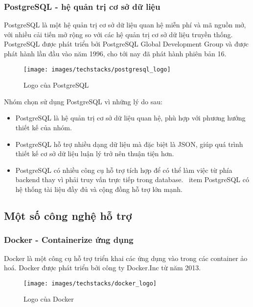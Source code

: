 \documentclass[../main.tex]{subfiles}
\begin{document}
	\subsubsection{PostgreSQL - hệ quản trị cơ sở dữ liệu}

	PostgreSQL là một hệ quản trị cơ sở dữ liệu quan hệ miễn phí và mã nguồn mở, với nhiều cải tiến mở rộng so với các hệ
	quản trị cơ sở dữ liệu truyền thống. PostgreSQL được phát triển bởi PostgreSQL Global Development Group và được phát
	hành lần đầu vào năm 1996, cho tới nay đã phát hành phiên bản 16.

	\begin{figure}[ht]
		\centering
		\texttt{[image: images/techstacks/postgresql\_logo]}
		\caption{Logo của PostgreSQL}
		\label{fig:pg-logo}
	\end{figure}

	Nhóm chọn sử dụng PostgreSQL vì những lý do sau:

	\begin{itemize}
		\item PostgreSQL là hệ quản trị cơ sở dữ liệu quan hệ, phù hợp với phương hướng thiết kế của nhóm.
		\item PostgreSQL hỗ trợ nhiều dạng dữ liệu mà đặc biệt là JSON, giúp quá trình thiết kế cơ sở dữ liệu luận lý trở
		nên thuận tiện hơn.
		\item PostgreSQL có nhiều công cụ hỗ trợ tích hợp để có thể làm việc từ phía \Gls{backend} thay vì phải truy vấn
		trực tiếp trong database.
		\ item PostgreSQL có hệ thống tài liệu đầy đủ và cộng đồng hỗ trợ lớn mạnh.
	\end{itemize}

	\subsection{Một số công nghệ hỗ trợ}

	\subsubsection{Docker - Containerize ứng dụng}

	Docker là một công cụ hỗ trợ triển khai các ứng dụng vào trong các container ảo hoá. Docker được phát triển bởi công
	ty Docker.Inc từ năm 2013.

	\begin{figure}[ht]
		\centering
		\texttt{[image: images/techstacks/docker\_logo]}
		\caption{Logo của Docker}
		\label{fig:docker-logo}
	\end{figure}
\end{document}
